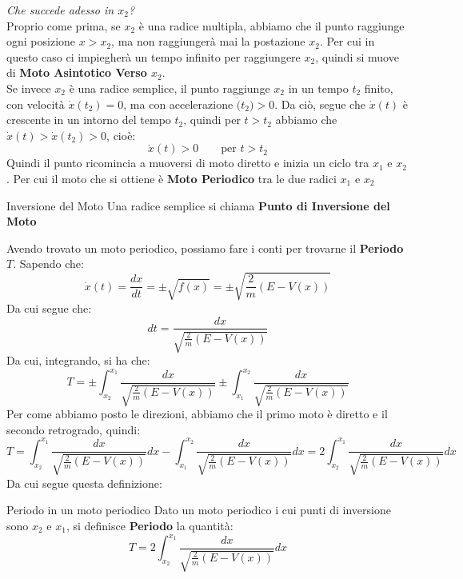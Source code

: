 \documentclass[11pt,a4paper,twoside]{article}
\theoremstyle{definition}
\begin{document}
\begin{center}
\end{center}
\textit{Che succede adesso in $x_2$?}\\
Proprio come prima, se $x_2$ è una radice multipla, abbiamo che il punto raggiunge ogni posizione $x>x_2$, ma non raggiungerà mai la postazione $x_2$. Per cui in questo caso ci impiegherà un tempo infinito per raggiungere $x_2$, quindi si muove di \textbf{Moto Asintotico Verso $x_2$}.\\
Se invece $x_2$ è una radice semplice, il punto raggiunge $x_2$ in un tempo $t_2$ finito, con velocità $\dot x(t_2)=0$, ma con accelerazione $\ddot (t_2)>0$. Da ciò, segue che $\dot x(t)$ è crescente in un intorno del tempo $t_2$, quindi per $t>t_2$ abbiamo che $\dot x(t)>\dot x(t_2)>0$, cioè:
\[ \dot x(t)>0\qquad \text{per }t>t_2 \]
Quindi il punto ricomincia a muoversi di moto diretto e inizia un ciclo tra $x_1$ e $x_2$. Per cui il moto che si ottiene è \textbf{Moto Periodico} tra le due radici $x_1$ e $x_2$

\begin{defn}{Inversione del Moto}{}
	Una radice semplice si chiama \textbf{Punto di Inversione del Moto}
\end{defn}

Avendo trovato un moto periodico, possiamo fare i conti per trovarne il \textbf{Periodo} $T$. Sapendo che:
\[ \dot x(t) = \frac{dx}{dt} = \pm \sqrt{f(x)} = \pm \sqrt{\frac 2m (E-V(x))} \]
Da cui segue che:
\[ dt = \frac{dx}{\sqrt{\frac 2m (E-V(x))}} \]
Da cui, integrando, si ha che:
\[ T = \pm\int_{x_2}^{x_1} \frac{dx}{\sqrt{\frac 2m (E-V(x))}} \pm \int_{x_1}^{x_2} \frac{dx}{\sqrt{\frac 2m (E-V(x))}} \]
Per come abbiamo posto le direzioni, abbiamo che il primo moto è diretto e il secondo retrogrado, quindi:
\[ T = \int_{x_2}^{x_1} \frac{dx}{\sqrt{\frac 2m (E-V(x))}}dx - \int_{x_1}^{x_2} \frac{dx}{\sqrt{\frac 2m (E-V(x))}} dx = 2 \int_{x_2}^{x_1}\frac{dx}{\sqrt{\frac 2m (E-V(x))}}dx \]
Da cui segue questa definizione:

\begin{defn}{Periodo in un moto periodico}{}
	Dato un moto periodico i cui punti di inversione sono $x_2$ e $x_1$, si definisce \textbf{Periodo} la quantità:
	\[ T = 2\int_{x_2}^{x_1} \frac{dx}{\sqrt{\frac 2m (E-V(x))}} dx \]
\end{defn}
\end{document}
